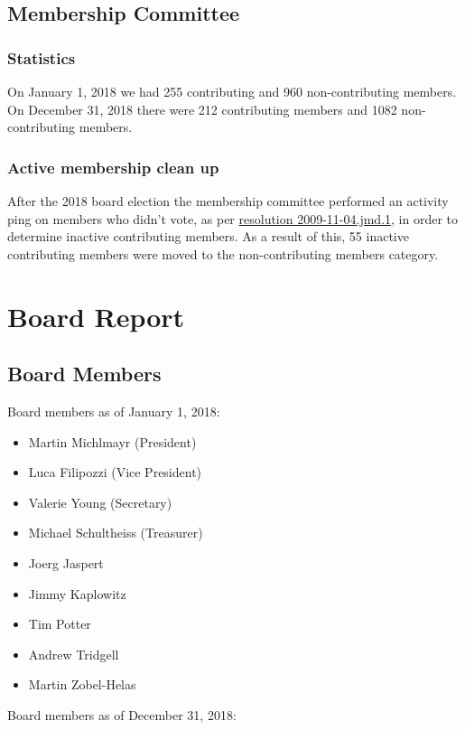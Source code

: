 \documentclass[a4paper]{report}
\begin{document}
\section{Membership Committee}

\subsection{Statistics}

On January 1, 2018 we had 255 contributing and 960 non-contributing
members.  On December 31, 2018 there were 212 contributing members and
1082 non-contributing members.

\subsection{Active membership clean up}

After the 2018 board election the membership committee performed an
activity ping on members who didn't vote, as per
\href{https://spi-inc.org/corporate/resolutions/2009/2009-11-04.jmd.1/}{resolution
2009-11-04.jmd.1}, in order to determine inactive contributing members.
As a result of this, 55 inactive contributing members were moved to the
non-contributing members category.

\chapter{Board Report}
\section{Board Members}

Board members as of January 1, 2018:

\begin{itemize}
\item Martin Michlmayr (President)
\item Luca Filipozzi (Vice President)
\item Valerie Young (Secretary)
\item Michael Schultheiss (Treasurer)
\item Joerg Jaspert
\item Jimmy Kaplowitz
\item Tim Potter
\item Andrew Tridgell
\item Martin Zobel-Helas
\end{itemize}

Board members as of December 31, 2018:
\end{document}
